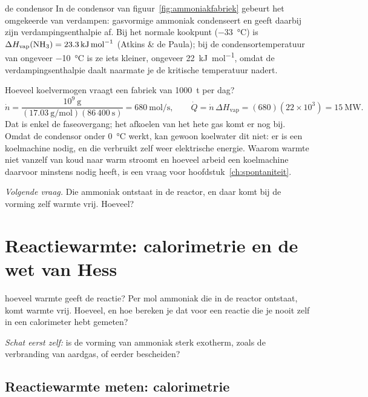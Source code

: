 \begin{casusuitgewerkt}{de condensor}
In de condensor van figuur~\ref{fig:ammoniakfabriek} gebeurt het omgekeerde van verdampen: gasvormige ammoniak condenseert en geeft daarbij zijn verdampingsenthalpie af. Bij het normale kookpunt (\SI{-33}{\celsius}) is $\Delta H_\text{vap}(\ce{NH3}) = \SI{23.3}{\kilo\joule\per\mole}$ (Atkins \& de Paula); bij de condensortemperatuur van ongeveer \SI{-10}{\celsius} is ze iets kleiner, ongeveer \SI{22}{\kilo\joule\per\mole}, omdat de verdampingsenthalpie daalt naarmate je de kritische temperatuur nadert.

Hoeveel koelvermogen vraagt een fabriek van \SI{1000}{\tonne}  per dag?
\[
\dot n = \frac{10^{9}\ \si{\gram}}{(17.03\ \si{\gram\per\mole})(86\,400\ \si{\second})} = \SI{680}{\mole\per\second},
\qquad
\dot Q = \dot n\,\Delta H_\text{vap} = (680)(22\times10^{3}) = \SI{15}{\mega\watt}.
\]
Dat is enkel de faseovergang; het afkoelen van het hete gas komt er nog bij. Omdat de condensor onder \SI{0}{\celsius} werkt, kan gewoon koelwater dit niet: er is een koelmachine nodig, en die verbruikt zelf weer elektrische energie. Waarom warmte niet vanzelf van koud naar warm stroomt en hoeveel arbeid een koelmachine daarvoor minstens nodig heeft, is een vraag voor hoofdstuk~\ref{ch:spontaniteit}.

\emph{Volgende vraag.} Die ammoniak ontstaat in de reactor, en daar komt bij de vorming zelf warmte vrij. Hoeveel?
\end{casusuitgewerkt}

\section{Reactiewarmte: calorimetrie en de wet van Hess}
\label{sec:hess}

\begin{casus}{hoeveel warmte geeft de reactie?}
Per mol ammoniak die in de reactor ontstaat, komt warmte vrij. Hoeveel, en hoe bereken je dat voor een reactie die je nooit zelf in een calorimeter hebt gemeten?

\emph{Schat eerst zelf:} is de vorming van ammoniak sterk exotherm, zoals de verbranding van aardgas, of eerder bescheiden?
\end{casus}

\subsection{Reactiewarmte meten: calorimetrie}

